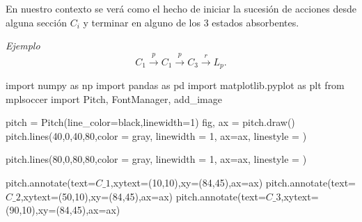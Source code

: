\documentclass[
  us-letterpaper,
  DIV=11,
  numbers=noendperiod]{scrreprt}
\newenvironment{Shaded}{\begin{snugshade}}{\end{snugshade}}
\newcommand{\DecValTok}[1]{\textcolor[rgb]{0.68,0.00,0.00}{#1}}
\newcommand{\ImportTok}[1]{\textcolor[rgb]{0.00,0.46,0.62}{#1}}
\newcommand{\NormalTok}[1]{\textcolor[rgb]{0.00,0.23,0.31}{#1}}
\newcommand{\OperatorTok}[1]{\textcolor[rgb]{0.37,0.37,0.37}{#1}}
\newcommand{\StringTok}[1]{\textcolor[rgb]{0.13,0.47,0.30}{#1}}
\begin{document}
En nuestro contexto se verá como el hecho de iniciar la sucesión de
acciones desde alguna sección \(C_i\) y terminar en alguno de los 3
estados absorbentes.

\emph{Ejemplo} \[
C_1\xrightarrow{p}C_1\xrightarrow{p}C_3\xrightarrow{r}L_p.
\]

\begin{Shaded}
\begin{Highlighting}[]
\ImportTok{import}\NormalTok{ numpy }\ImportTok{as}\NormalTok{ np }
\ImportTok{import}\NormalTok{ pandas }\ImportTok{as}\NormalTok{ pd}
\ImportTok{import}\NormalTok{ matplotlib.pyplot }\ImportTok{as}\NormalTok{ plt }
\ImportTok{from}\NormalTok{ mplsoccer }\ImportTok{import}\NormalTok{ Pitch, FontManager, add\_image}

\NormalTok{pitch }\OperatorTok{=}\NormalTok{ Pitch(line\_color}\OperatorTok{=}\StringTok{\textquotesingle{}black\textquotesingle{}}\NormalTok{,linewidth}\OperatorTok{=}\DecValTok{1}\NormalTok{)}
\NormalTok{fig, ax }\OperatorTok{=}\NormalTok{ pitch.draw()}
\NormalTok{pitch.lines(}\DecValTok{40}\NormalTok{,}\DecValTok{0}\NormalTok{,}\DecValTok{40}\NormalTok{,}\DecValTok{80}\NormalTok{,color }\OperatorTok{=} \StringTok{\textquotesingle{}gray\textquotesingle{}}\NormalTok{, linewidth }\OperatorTok{=} \DecValTok{1}\NormalTok{, ax}\OperatorTok{=}\NormalTok{ax, linestyle }\OperatorTok{=} \StringTok{\textquotesingle{}{-}{-}\textquotesingle{}}\NormalTok{)}

\NormalTok{pitch.lines(}\DecValTok{80}\NormalTok{,}\DecValTok{0}\NormalTok{,}\DecValTok{80}\NormalTok{,}\DecValTok{80}\NormalTok{,color }\OperatorTok{=} \StringTok{\textquotesingle{}gray\textquotesingle{}}\NormalTok{, linewidth }\OperatorTok{=} \DecValTok{1}\NormalTok{, ax}\OperatorTok{=}\NormalTok{ax, linestyle }\OperatorTok{=} \StringTok{\textquotesingle{}{-}{-}\textquotesingle{}}\NormalTok{)}

\NormalTok{pitch.annotate(text}\OperatorTok{=}\StringTok{\textquotesingle{}$C\_1$\textquotesingle{}}\NormalTok{,xytext}\OperatorTok{=}\NormalTok{(}\DecValTok{10}\NormalTok{,}\DecValTok{10}\NormalTok{),xy}\OperatorTok{=}\NormalTok{(}\DecValTok{84}\NormalTok{,}\DecValTok{45}\NormalTok{),ax}\OperatorTok{=}\NormalTok{ax)}
\NormalTok{pitch.annotate(text}\OperatorTok{=}\StringTok{\textquotesingle{}$C\_2$\textquotesingle{}}\NormalTok{,xytext}\OperatorTok{=}\NormalTok{(}\DecValTok{50}\NormalTok{,}\DecValTok{10}\NormalTok{),xy}\OperatorTok{=}\NormalTok{(}\DecValTok{84}\NormalTok{,}\DecValTok{45}\NormalTok{),ax}\OperatorTok{=}\NormalTok{ax)}
\NormalTok{pitch.annotate(text}\OperatorTok{=}\StringTok{\textquotesingle{}$C\_3$\textquotesingle{}}\NormalTok{,xytext}\OperatorTok{=}\NormalTok{(}\DecValTok{90}\NormalTok{,}\DecValTok{10}\NormalTok{),xy}\OperatorTok{=}\NormalTok{(}\DecValTok{84}\NormalTok{,}\DecValTok{45}\NormalTok{),ax}\OperatorTok{=}\NormalTok{ax)}


\end{Highlighting}
\end{Shaded}
\end{document}
